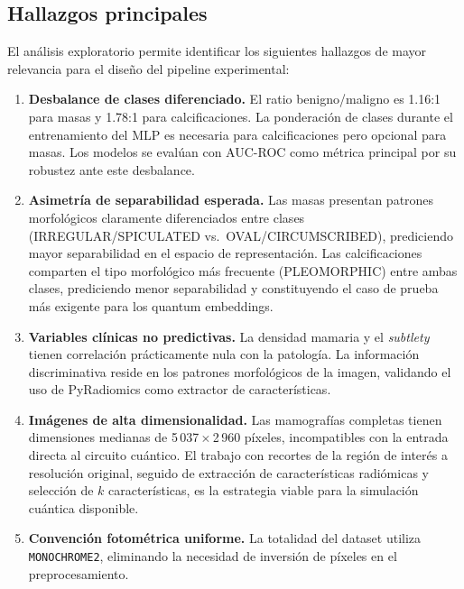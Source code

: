 
\subsection{Hallazgos principales}

El análisis exploratorio permite identificar los
siguientes hallazgos de mayor relevancia para el
diseño del pipeline experimental:

\begin{enumerate}

\item \textbf{Desbalance de clases diferenciado.}
El ratio benigno/maligno es 1.16:1 para masas y
1.78:1 para calcificaciones. La ponderación de
clases durante el entrenamiento del MLP es
necesaria para calcificaciones pero opcional para
masas. Los modelos se evalúan con AUC-ROC como
métrica principal por su robustez ante este
desbalance.

\item \textbf{Asimetría de separabilidad esperada.}
Las masas presentan patrones morfológicos
claramente diferenciados entre clases
(IRREGULAR/\allowbreak SPICULATED vs.\ OVAL/\allowbreak CIRCUMSCRIBED),
prediciendo mayor separabilidad en el espacio
de representación. Las calcificaciones comparten
el tipo morfológico más frecuente (PLEOMORPHIC)
entre ambas clases, prediciendo menor separabilidad
y constituyendo el caso de prueba más exigente
para los quantum embeddings.

\item \textbf{Variables clínicas no predictivas.}
La densidad mamaria y el \textit{subtlety}
tienen correlación prácticamente nula con la
patología. La información discriminativa reside
en los patrones morfológicos de la imagen,
validando el uso de PyRadiomics como extractor
de características.

\item \textbf{Imágenes de alta dimensionalidad.}
Las mamografías completas tienen dimensiones
medianas de 5\,037\,$\times$\,2\,960 píxeles,
incompatibles con la entrada directa al circuito
cuántico. El trabajo con recortes de la región de
interés a resolución original, seguido de
extracción de características radiómicas y selección
de $k$ características, es la estrategia viable para
la simulación cuántica disponible.

\item \textbf{Convención fotométrica uniforme.}
La totalidad del dataset utiliza \texttt{MONOCHROME2},
eliminando la necesidad de inversión de píxeles
en el preprocesamiento.

\end{enumerate}
